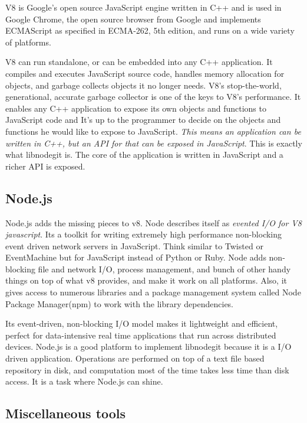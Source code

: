 V8 is Google\’'s open source JavaScript engine written in C++ and is used in
Google Chrome, the open source browser from Google and implements ECMAScript as
specified in ECMA-262, 5th edition, and runs on a wide variety of platforms.

V8 can run standalone, or can be embedded into any C++ application. It compiles
and executes JavaScript source code, handles memory allocation for objects, and
garbage collects objects it no longer needs. V8’s stop-the-world, generational,
accurate garbage collector is one of the keys to V8’s performance. It enables
any C++ application to expose its own objects and functions to JavaScript code
and It’s up to the programmer to decide on the objects and functions he would
like to expose to JavaScript. \textit{This means an application can be written
  in C++, but an API for that can be exposed in JavaScript}. This is exactly
what libnodegit is. The core of the application is written in JavaScript and a
richer API is exposed.

\subsection{Node.js }

Node.js adds the missing pieces to v8. Node describes itself as \textit{evented
  I/O for V8 javascript}. Its a toolkit for writing extremely high performance
non-blocking event driven network servers in JavaScript. Think similar to
Twisted\cite{twisted} or EventMachine\cite{eventmachine} but for JavaScript
instead of Python or Ruby. Node adds non-blocking file and network I/O, process
management, and bunch of other handy things on top of what v8 provides, and make
it work on all platforms. Also, it gives access to numerous libraries and a
package management system called Node Package Manager(npm)\cite{npm} to work
with the library dependencies.

Its event-driven, non-blocking I/O model makes it lightweight and efficient,
perfect for data-intensive real time applications that run across distributed
devices. Node.js is a good platform to implement libnodegit because it is a I/O
driven application. Operations are performed on top of a text file based
repository in disk, and computation most of the time takes less time than disk
access. It is a task where Node.js can shine.

\subsection{Miscellaneous tools}

